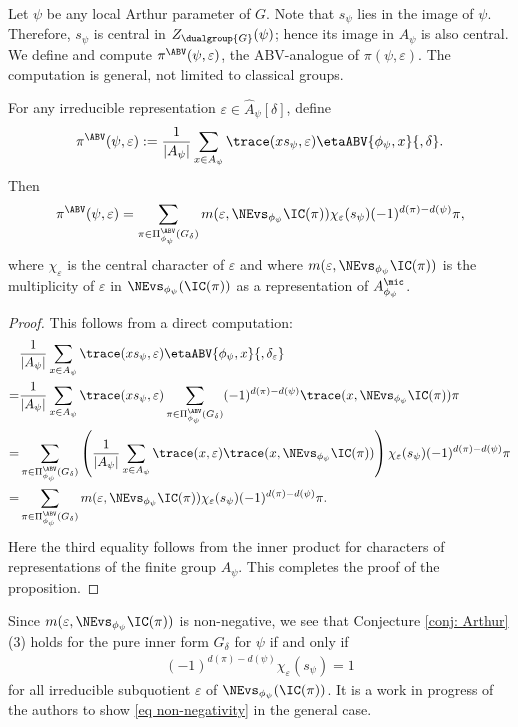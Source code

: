 \documentclass[11pt,letterpaper]{amsart}
\numberwithin{equation}{section}
\begin{document}
Let $\psi$ be any local Arthur parameter of $G$. Note that $s_{\psi}$ lies in the image of $\psi$. Therefore, $s_{\psi}$ is central in $Z_{\dualgroup{G}}(\psi)$; hence its image in $A_{\psi}$ is also central. We define and compute $\pi^{\ABV}(\psi,\varepsilon)$, the ABV-analogue of $\pi(\psi, \varepsilon)$. {The computation is general, not limited to classical groups.}
\begin{proposition}\label{prop pi psi varepsilon ABV}
     For any irreducible representation $\varepsilon\in 
    \widehat{A}_{\psi}[\delta]$, define
    \[ \pi^{\ABV}(\psi,\varepsilon):= \frac{1}{|A_{\psi}| } \sum_{x \in A_{\psi}} \trace(xs_{\psi}, \varepsilon) \etaABV{\phi_{\psi},x}{,\delta}.\]
    Then 
    \[\pi^{\ABV}(\psi,\varepsilon)= \sum_{\pi \in \Pi_{\phi_{\psi}}^{\ABV}(G_{\delta})}  m(\varepsilon, \NEvs_{\phi_{\psi}}\IC(\pi)) \chi_{\varepsilon}(s_{\psi}) (-1)^{d(\pi)-d(\psi)} \pi ,\]
    where $\chi_{\varepsilon}$ is the central character of $\varepsilon$ and where $m(\varepsilon, \NEvs_{\phi_{\psi}}\IC(\pi))$ is the multiplicity of $\varepsilon$ in $\NEvs_{\phi_{\psi}}(\IC(\pi))$ as a representation of $A_{\phi_{\psi}}^{\mic}$.
\end{proposition}
\begin{proof}
    This follows from a direct computation:
    \begin{align*}
         &\frac{1}{|A_{\psi}| } \sum_{x \in A_{\psi}} \trace(xs_{\psi}, \varepsilon) \etaABV{\phi_{\psi},x}{,\delta_{\varepsilon}}\\
         =&\frac{1}{|A_{\psi}| } \sum_{x \in A_{\psi}} \trace(xs_{\psi}, \varepsilon) \sum_{\pi \in \Pi_{\phi_{\psi}}^{\ABV}(G_{\delta})} (-1)^{d(\pi)-d(\psi)}\trace(x, \NEvs_{\phi_{\psi}}\IC(\pi)) \pi\\
         =& \sum_{\pi \in \Pi_{\phi_{\psi}}^{\ABV}(G_{\delta})}  \left(\frac{1}{|A_{\psi}| } \sum_{x \in A_{\psi}} \trace(x, \varepsilon)\trace(x, \NEvs_{\phi_{\psi}}\IC(\pi)) \right) \chi_{\varepsilon}(s_{\psi})(-1)^{d(\pi)-d(\psi)} \pi\\
         =& \sum_{\pi \in \Pi_{\phi_{\psi}}^{\ABV}(G_{\delta})}  m(\varepsilon, \NEvs_{\phi_{\psi}}\IC(\pi)) \chi_{\varepsilon} (s_{\psi})(-1)^{d(\pi)-d(\psi)} \pi.
    \end{align*}
    Here the third equality follows from the inner product for  characters of representations of the finite group $A_{\psi}$. This completes the proof of the proposition.
\end{proof}
\begin{remark}\label{rmk non-negative}
    Since $m(\varepsilon, \NEvs_{\phi_{\psi}}\IC(\pi))$ is non-negative, we see that Conjecture \ref{conj: Arthur}(3) holds for the pure inner form $G_{\delta}$ for $\psi$ if and only if 
    \begin{align}\label{eq non-negativity}
        (-1)^{d(\pi)-d(\psi)}
    \chi_\varepsilon(s_{\psi})=1
    \end{align} 
    for all irreducible subquotient $\varepsilon$ of $ \NEvs_{\phi_{\psi}}  (\IC(\pi))$. 
    It is a work in progress of the authors to show \eqref{eq non-negativity} in the general case.
\end{remark}
\end{document}
